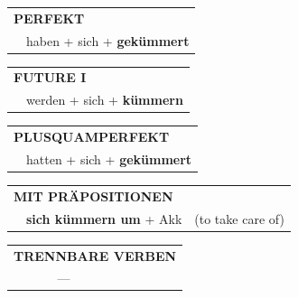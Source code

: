 \documentclass[10pt,a4paper]{revtex4-2}
\begin{document}
\begin{verbbox}
 \begin{tabular}{rl}
     \multicolumn{2}{l}{\textbf{PERFEKT}}\\
    &haben + sich + \textbf{gekümmert}\\
  \end{tabular}
\hfill
   \begin{tabular}{rl}
   
    \multicolumn{2}{l}{\textbf{FUTURE I} }\\
    &werden + sich + \textbf{kümmern}\\
 
  \end{tabular}
\hfill
   \begin{tabular}{rl}
      \multicolumn{2}{l}{\textbf{PLUSQUAMPERFEKT}}\\
    &hatten + sich + \textbf{gekümmert}\\
  \end{tabular}
  
\vspace{10pt}

   \begin{tabular}{lll}
      \multicolumn{3}{l}{\textbf{MIT PRÄPOSITIONEN}}\\
& \textbf{sich kümmern um} + Akk & (to take care of)
  \end{tabular}
  \hfill
   \begin{tabular}{lll}
      \multicolumn{3}{l}{\textbf{TRENNBARE VERBEN}}\\
& --- & \\
  \end{tabular}
  
  \vspace{-5pt}

\end{verbbox}
\end{document}
